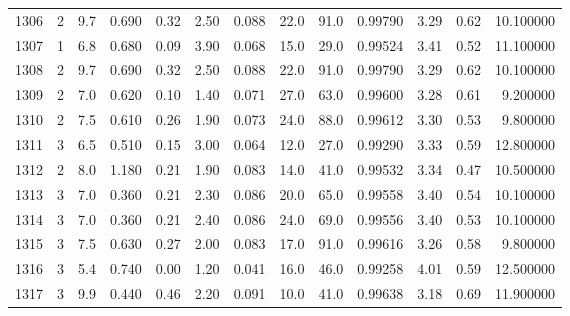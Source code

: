 \begin{tabular}{lrrrrrrrrrrrr}
1306 &        2 &            9.7 &             0.690 &         0.32 &            2.50 &      0.088 &                 22.0 &                  91.0 &  0.99790 &  3.29 &       0.62 &  10.100000 \\
1307 &        1 &            6.8 &             0.680 &         0.09 &            3.90 &      0.068 &                 15.0 &                  29.0 &  0.99524 &  3.41 &       0.52 &  11.100000 \\
1308 &        2 &            9.7 &             0.690 &         0.32 &            2.50 &      0.088 &                 22.0 &                  91.0 &  0.99790 &  3.29 &       0.62 &  10.100000 \\
1309 &        2 &            7.0 &             0.620 &         0.10 &            1.40 &      0.071 &                 27.0 &                  63.0 &  0.99600 &  3.28 &       0.61 &   9.200000 \\
1310 &        2 &            7.5 &             0.610 &         0.26 &            1.90 &      0.073 &                 24.0 &                  88.0 &  0.99612 &  3.30 &       0.53 &   9.800000 \\
1311 &        3 &            6.5 &             0.510 &         0.15 &            3.00 &      0.064 &                 12.0 &                  27.0 &  0.99290 &  3.33 &       0.59 &  12.800000 \\
1312 &        2 &            8.0 &             1.180 &         0.21 &            1.90 &      0.083 &                 14.0 &                  41.0 &  0.99532 &  3.34 &       0.47 &  10.500000 \\
1313 &        3 &            7.0 &             0.360 &         0.21 &            2.30 &      0.086 &                 20.0 &                  65.0 &  0.99558 &  3.40 &       0.54 &  10.100000 \\
1314 &        3 &            7.0 &             0.360 &         0.21 &            2.40 &      0.086 &                 24.0 &                  69.0 &  0.99556 &  3.40 &       0.53 &  10.100000 \\
1315 &        3 &            7.5 &             0.630 &         0.27 &            2.00 &      0.083 &                 17.0 &                  91.0 &  0.99616 &  3.26 &       0.58 &   9.800000 \\
1316 &        3 &            5.4 &             0.740 &         0.00 &            1.20 &      0.041 &                 16.0 &                  46.0 &  0.99258 &  4.01 &       0.59 &  12.500000 \\
1317 &        3 &            9.9 &             0.440 &         0.46 &            2.20 &      0.091 &                 10.0 &                  41.0 &  0.99638 &  3.18 &       0.69 &  11.900000 \\

\end{tabular}
